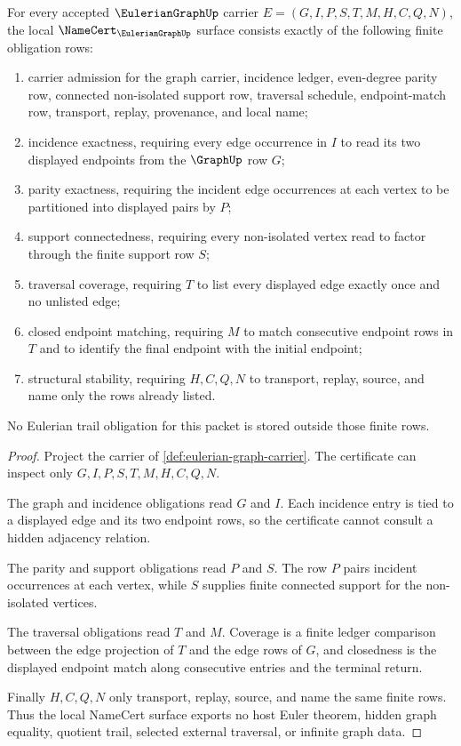 \begin{theorem}
\label{thm:eulerian-graph-namecert-obligations}
For every accepted $\EulerianGraphUp$ carrier $E=(G,I,P,S,T,M,H,C,Q,N)$, the local $\NameCert_{\EulerianGraphUp}$ surface consists exactly of the following finite obligation rows:
\begin{enumerate}
\item carrier admission for the graph carrier, incidence ledger, even-degree parity row, connected non-isolated support row, traversal schedule, endpoint-match row, transport, replay, provenance, and local name;
\item incidence exactness, requiring every edge occurrence in $I$ to read its two displayed endpoints from the $\GraphUp$ row $G$;
\item parity exactness, requiring the incident edge occurrences at each vertex to be partitioned into displayed pairs by $P$;
\item support connectedness, requiring every non-isolated vertex read to factor through the finite support row $S$;
\item traversal coverage, requiring $T$ to list every displayed edge exactly once and no unlisted edge;
\item closed endpoint matching, requiring $M$ to match consecutive endpoint rows in $T$ and to identify the final endpoint with the initial endpoint;
\item structural stability, requiring $H,C,Q,N$ to transport, replay, source, and name only the rows already listed.
\end{enumerate}
No Eulerian trail obligation for this packet is stored outside those finite rows.
\end{theorem}
\begin{proof}
Project the carrier of \autoref{def:eulerian-graph-carrier}. The certificate can inspect only $G,I,P,S,T,M,H,C,Q,N$.

The graph and incidence obligations read $G$ and $I$. Each incidence entry is tied to a displayed edge and its two endpoint rows, so the certificate cannot consult a hidden adjacency relation.

The parity and support obligations read $P$ and $S$. The row $P$ pairs incident occurrences at each vertex, while $S$ supplies finite connected support for the non-isolated vertices.

The traversal obligations read $T$ and $M$. Coverage is a finite ledger comparison between the edge projection of $T$ and the edge rows of $G$, and closedness is the displayed endpoint match along consecutive entries and the terminal return.

Finally $H,C,Q,N$ only transport, replay, source, and name the same finite rows. Thus the local NameCert surface exports no host Euler theorem, hidden graph equality, quotient trail, selected external traversal, or infinite graph data.
\end{proof}

